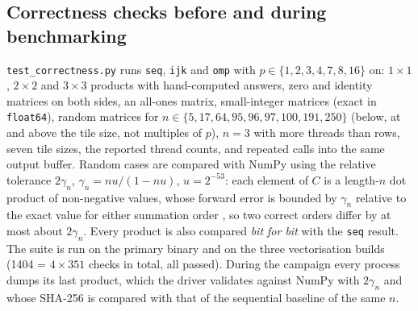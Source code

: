\subsection{Correctness checks before and during benchmarking}
\texttt{test\_correctness.py} runs \texttt{seq}, \texttt{ijk} and \texttt{omp} with $p\in\{1,2,3,4,7,8,16\}$ on: $1\times1$, $2\times2$ and
$3\times3$ products with hand-computed answers, zero and identity matrices on both sides, an all-ones matrix, small-integer matrices (exact
in \texttt{float64}), random matrices for $n\in\{5,17,64,95,96,97,100,191,250\}$ (below, at and above the tile size, not multiples of $p$),
$n=3$ with more threads than rows, seven tile sizes, the reported thread counts, and repeated calls into the same output buffer.
Random cases are compared with NumPy \cite{numpy} using the relative tolerance $2\gamma_n$, $\gamma_n=nu/(1-nu)$, $u=2^{-53}$: each element of
$C$ is a length-$n$ dot product of non-negative values, whose forward error is bounded by $\gamma_n$ relative to the exact value for
either summation order \cite{higham}, so two correct orders differ by at most about $2\gamma_n$. Every product is also compared
\emph{bit for bit} with the \texttt{seq} result. The suite is run on the primary binary and on the three vectorisation builds
(1404 = $4\times351$ checks in total, all passed). During the campaign every process dumps its last product, which the driver validates against
NumPy with $2\gamma_n$ and whose SHA-256 is compared with that of the sequential baseline of the same $n$.

